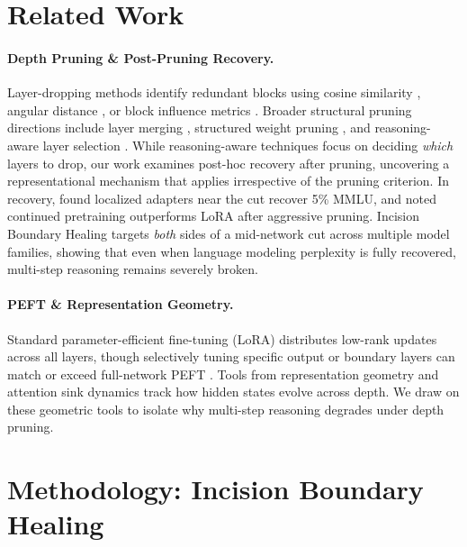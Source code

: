 \documentclass[pmlr,onecolumn]{jmlr}
\begin{document}
\section{Related Work}

\paragraph{Depth Pruning \& Post-Pruning Recovery.}
Layer-dropping methods identify redundant blocks using cosine similarity \citep{gromov2024unreasonable}, angular distance \citep{siddiqui2024deeper}, or block influence metrics \citep{men-etal-2025-shortgpt}. Broader structural pruning directions include layer merging \citep{yang-etal-2024-laco}, structured weight pruning \citep{ma2023llmpruner,frantar2023sparsegpt,sun2024wanda,ashkboos2024slicegpt,kolawole2024bonsai}, and reasoning-aware layer selection \citep{wang2025resp,qian2026rku,sheth2026cap,wang2026gisp,monjur2026ttspruning}. While reasoning-aware techniques focus on deciding \emph{which} layers to drop, our work examines post-hoc recovery after pruning, uncovering a representational mechanism that applies irrespective of the pruning criterion. In recovery, \citet{siddiqui2024deeper} found localized adapters near the cut recover 5\% MMLU, and \citet{kim2024shortened} noted continued pretraining outperforms LoRA after aggressive pruning. Incision Boundary Healing targets \emph{both} sides of a mid-network cut across multiple model families, showing that even when language modeling perplexity is fully recovered, multi-step reasoning remains severely broken.

\paragraph{PEFT \& Representation Geometry.}
Standard parameter-efficient fine-tuning (LoRA) \citep{hu2022lora} distributes low-rank updates across all layers, though selectively tuning specific output or boundary layers can match or exceed full-network PEFT \citep{yaolu2024reassessing}. Tools from representation geometry \citep{nostalgebraist2021lens} and attention sink dynamics \citep{xiao2023efficient} track how hidden states evolve across depth. We draw on these geometric tools to isolate why multi-step reasoning degrades under depth pruning.

\section{Methodology: Incision Boundary Healing}
\end{document}

